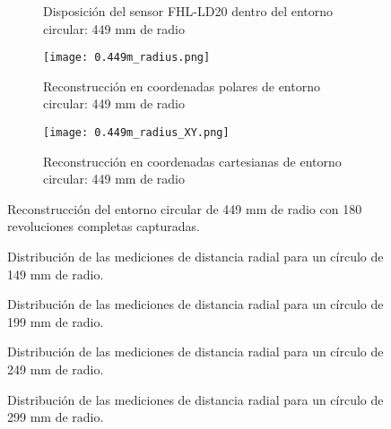 \begin{figure}[H]
	\centering
	\begin{subfigure}{\textwidth}
		\centering
		\caption{Disposición del sensor FHL-LD20 dentro del entorno circular: 449 mm de radio}
		\label{fig:disposicion_lidar_var7}
		\vspace{1em}
	\end{subfigure}
	\begin{subfigure}{0.45\textwidth}
		\centering
		\texttt{[image: 0.449m\_radius.png]}
		\caption{Reconstrucción en coordenadas polares de entorno circular: 449 mm de radio}
		\label{fig:449m_radius_xy}
	\end{subfigure}
	\hspace{1em}
	\begin{subfigure}{0.45\textwidth}
		\centering
		\texttt{[image: 0.449m\_radius\_XY.png]}
		\caption{Reconstrucción en coordenadas cartesianas de entorno circular: 449 mm de radio}
		\label{fig:449m_radius}
	\end{subfigure}
	\caption{Reconstrucción del entorno circular de 449 mm de radio con 180 revoluciones completas capturadas.}
	\label{fig:disposicion_lidar_var_dist7}
\end{figure}

\begin{figure}[H]
	\centering
	\caption{Distribución de las mediciones de distancia radial para un círculo de 149 mm de radio.}
	\label{fig:histograma_dists1}
\end{figure}

\begin{figure}[H]
	\centering
	\caption{Distribución de las mediciones de distancia radial para un círculo de 199 mm de radio.}
	\label{fig:histograma_dists2}
\end{figure}

\begin{figure}[H]
	\centering
	\caption{Distribución de las mediciones de distancia radial para un círculo de 249 mm de radio.}
	\label{fig:histograma_dists3}
\end{figure}

\begin{figure}[H]
	\centering
	\caption{Distribución de las mediciones de distancia radial para un círculo de 299 mm de radio.}
	\label{fig:histograma_dists4}
\end{figure}

